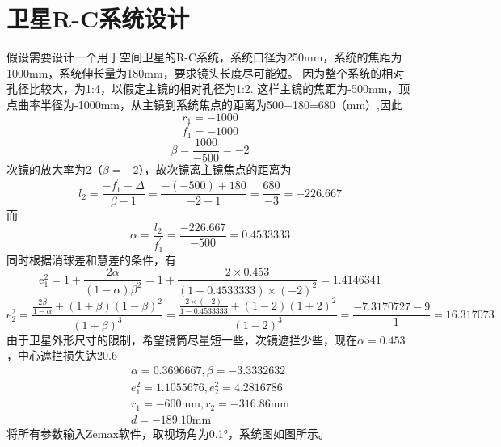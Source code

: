 \section{卫星R-C系统设计}
假设需要设计一个用于空间卫星的R-C系统，系统口径为250mm，系统的焦距为1000mm，系统伸长量为180mm，要求镜头长度尽可能短。
因为整个系统的相对孔径比较大，为1:4，以假定主镜的相对孔径为1:2.  这样主镜的焦距为-500mm，顶点曲率半径为-1000mm，从主镜到系统焦点的距离为500+180=680（mm）,因此
$$ r_1=-1000 $$
$$ f_1 ^{'}=-1000 $$
$$
\beta=\dfrac{1000}{-500}=-2
$$
次镜的放大率为2（$\beta = - 2$），故次镜离主镜焦点的距离为
$$ l _ { 2 } = \frac { - f _ { 1 } ^ { \prime } + \Delta } { \beta - 1 } = \frac { - ( - 500 ) + 180 } { - 2 - 1 } = \frac { 680 } { - 3 } = - 226.667 $$
而
$$ \alpha = \frac { l _ { 2 } } { f _ { 1 } ^ { \prime } } = \frac { - 226.667 } { - 500 } = 0.4533333 $$
同时根据消球差和慧差的条件，有
$$ \mathrm { e } _ { 1 } ^ { 2 } = 1 + \frac { 2 \alpha } { ( 1 - \alpha ) \beta ^ { 2 } } = 1 + \frac { 2 \times 0.453 } { ( 1 - 0.4533333 ) \times ( - 2 ) ^ { 2 } } = 1.4146341 $$
$$ e _ { 2 } ^ { 2 } = \frac { \frac { 2 \beta } { 1 - \alpha } + ( 1 + \beta ) ( 1 - \beta ) ^ { 2 } } { ( 1 + \beta ) ^ { 3 } } = \frac { \frac { 2 \times ( - 2 ) } { 1 - 0.4533333 } + ( 1 - 2 ) ( 1 + 2 ) ^ { 2 } } { ( 1 - 2 ) ^ { 3 } } = \frac { - 7.3170727 - 9 } { - 1 }=16.317073 $$
由于卫星外形尺寸的限制，希望镜筒尽量短一些，次镜遮拦少些，现在$\alpha = 0.453$，中心遮拦损失达20.6%
$$ \begin{array} { l } { \alpha = 0.3696667 , \beta = - 3.3332632 } \\ { e _ { 1 } ^ { 2 } = 1.1055676 , e _ { 2 } ^ { 2 } = 4.2816786 } \\ { r _ { 1 } = - 600 \mathrm { mm } , r _ { 2 } = - 316.86 \mathrm { mm } } \\ { d = - 189.10 \mathrm { mm } } \end{array} $$
将所有参数输入Zemax软件，取视场角为0.1°，系统图如图所示。